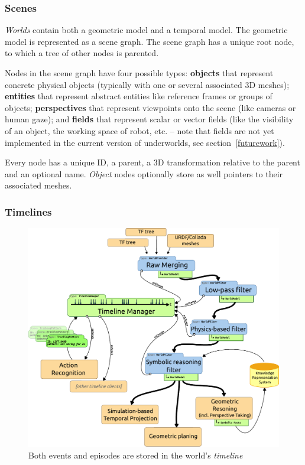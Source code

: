 \documentclass[letterpaper, 10 pt, conference]{ieeeconf}  %
\newcommand{\uwds}{{\sc underworlds}\xspace}
\begin{document}
\subsubsection{Scenes}

\emph{Worlds} contain both a geometric model and a temporal model. The geometric
model is represented as a scene graph. The scene graph has a unique root node,
to which a tree of other nodes is parented.

Nodes in the scene graph have four possible types: \textbf{objects} that represent
concrete physical objects (typically with one or several associated 3D meshes);
\textbf{entities} that represent abstract entities like reference frames or
groups of objects; \textbf{perspectives} that represent viewpoints onto the
scene (like cameras or human gaze); and \textbf{fields} that represent scalar or
vector fields (like the visibility of an object, the working space of robot,
etc. -- note that fields are not yet implemented in the current version of
\uwds, see section~\ref{futurework}).

Every node has a unique ID, a parent, a 3D transformation relative to the parent
and an optional name. \emph{Object} nodes optionally store as well pointers to their
associated meshes.

\subsubsection{Timelines}

\begin{figure}
    \centering
    \includegraphics[width=0.9\linewidth]{timeline}
    \caption{Both events and episodes are stored in the world's \emph{timeline}}

    \label{fig|timeline}
\end{figure}
\end{document}
